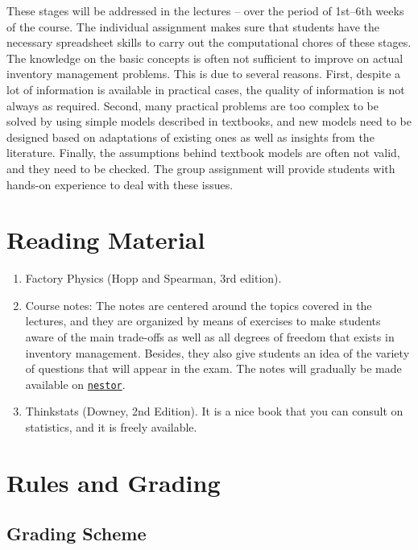 \documentclass{article}
\begin{document}
These stages will be addressed in the lectures -- over the period of 1st--6th weeks of the course. The individual assignment makes sure that students have the necessary spreadsheet skills to carry out the computational chores of these stages. The knowledge on the basic concepts is often not sufficient to improve on actual inventory management problems. This is due to several reasons. First, despite a lot of information is available in practical cases, the quality of information is not always as required. Second, many practical problems are too complex to be solved by using simple models described in textbooks, and new models need to be designed based on adaptations of existing ones as well as insights from the literature. Finally, the assumptions behind textbook models are often not valid, and they need to be checked. The group assignment will provide students with hands-on experience to deal with these issues. 


\section{Reading Material}

\begin{enumerate}
\item Factory Physics (Hopp and Spearman, 3rd edition).
\item Course notes: The notes are centered around the topics covered in the lectures, and they are organized by means of exercises to make students aware of the main trade-offs as well as all degrees of freedom that exists in inventory management. Besides, they also give students an idea of the variety of questions that will appear in the exam. The notes will gradually be made available on \href{nestor.rug.nl}{\texttt{nestor}}.
\item Thinkstats (Downey, 2nd Edition). It is a nice book that you can consult on statistics, and it is freely available.
\end{enumerate}


\section{Rules and Grading}

\subsection{Grading Scheme}
\end{document}
